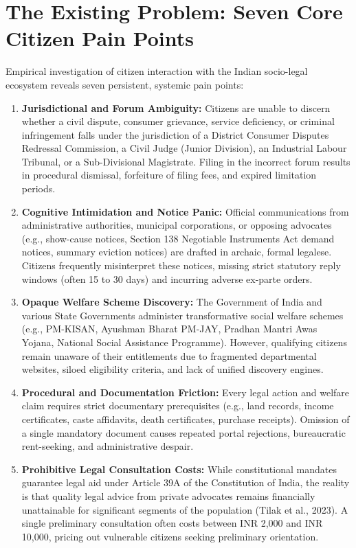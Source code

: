 \section{The Existing Problem: Seven Core Citizen Pain Points}
\label{sec:pain_points}
Empirical investigation of citizen interaction with the Indian socio-legal ecosystem reveals seven persistent, systemic pain points:

\begin{enumerate}
    \item \textbf{Jurisdictional and Forum Ambiguity:} Citizens are unable to discern whether a civil dispute, consumer grievance, service deficiency, or criminal infringement falls under the jurisdiction of a District Consumer Disputes Redressal Commission, a Civil Judge (Junior Division), an Industrial Labour Tribunal, or a Sub-Divisional Magistrate. Filing in the incorrect forum results in procedural dismissal, forfeiture of filing fees, and expired limitation periods.
    \item \textbf{Cognitive Intimidation and Notice Panic:} Official communications from administrative authorities, municipal corporations, or opposing advocates (e.g., show-cause notices, Section 138 Negotiable Instruments Act demand notices, summary eviction notices) are drafted in archaic, formal legalese. Citizens frequently misinterpret these notices, missing strict statutory reply windows (often 15 to 30 days) and incurring adverse ex-parte orders.
    \item \textbf{Opaque Welfare Scheme Discovery:} The Government of India and various State Governments administer transformative social welfare schemes (e.g., PM-KISAN, Ayushman Bharat PM-JAY, Pradhan Mantri Awas Yojana, National Social Assistance Programme). However, qualifying citizens remain unaware of their entitlements due to fragmented departmental websites, siloed eligibility criteria, and lack of unified discovery engines.
    \item \textbf{Procedural and Documentation Friction:} Every legal action and welfare claim requires strict documentary prerequisites (e.g., land records, income certificates, caste affidavits, death certificates, purchase receipts). Omission of a single mandatory document causes repeated portal rejections, bureaucratic rent-seeking, and administrative despair.
    \item \textbf{Prohibitive Legal Consultation Costs:} While constitutional mandates guarantee legal aid under Article 39A of the Constitution of India, the reality is that quality legal advice from private advocates remains financially unattainable for significant segments of the population (Tilak et al., 2023). A single preliminary consultation often costs between INR 2,000 and INR 10,000, pricing out vulnerable citizens seeking preliminary orientation.

\end{enumerate}
